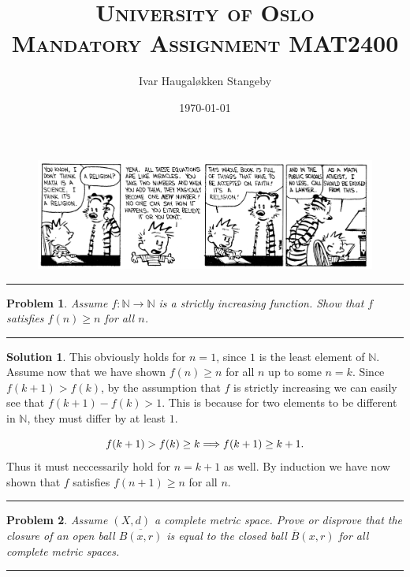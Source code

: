 \documentclass[a4paper]{article}
\title{
  \normalfont \textsc{{University of Oslo}}\\ [25pt]
  \huge{\textsc{Mandatory Assignment  MAT2400}} \\
}
\author{Ivar Haugaløkken Stangeby}
\date{\today}
\newtheorem{prb}{Problem}
\theoremstyle{definition}
\newtheorem{sol}{Solution}
\newcommand{\horrule}[1]{\noindent\rule{\linewidth}{#1}}
\begin{document}
\maketitle
\begin{figure}[h]
  \centering
  \includegraphics[width=\linewidth]{calvinmathatheist}
\end{figure}
\vspace{20pt}
\horrule{0.5pt}
\begin{prb}
  Assume $f : \mathbb{N} \rightarrow \mathbb{N}$ is a strictly increasing function.
  Show that $f$ satisfies $f(n) \geq n$ for all $n$.
\end{prb}
\horrule{0.5pt}

\begin{sol}
This obviously holds for $n = 1$, since $1$ is the least element of
$\mathbb{N}$.  Assume now that we have shown $f(n) \geq n$ for all $n$ up to
some $n = k$.  Since $f(k+1) > f(k)$, by the assumption that $f$ is strictly
increasing we can easily see that $f(k+1) - f(k) > 1$. This is because for two
elements to be different in $\mathbb{N}$, they must differ by at least $1$.

\begin{equation}
  \notag
  f(k+1) > f(k) \geq k \Longrightarrow f(k+1) \geq k + 1.
\end{equation}
Thus it must neccessarily hold for $n = k+1$ as well.
By induction we have now shown that $f$ satisfies $f(n+1) \geq n$ for all $n$.
\end{sol}

\horrule{0.5pt}
\begin{prb}
  Assume $\left( X, d \right)$ a complete metric space. Prove or disprove that the closure of
  an open ball $\overline{ B\left( x, r \right)}$ is equal to the closed ball
  $\overline{ B }\left( x, r \right)$ for all complete metric spaces.
\end{prb}
\horrule{0.5pt}
\end{document}
